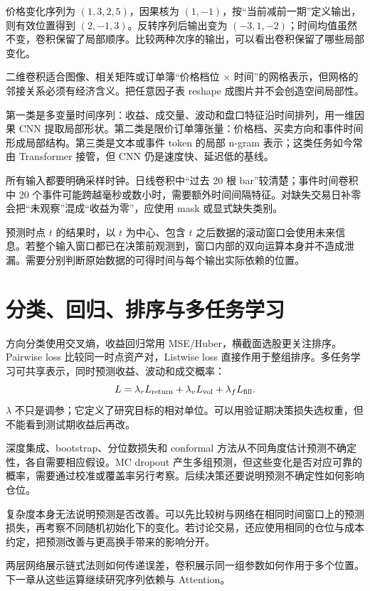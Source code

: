 


价格变化序列为 $(1,3,2,5)$，因果核为 $(1,-1)$，按“当前减前一期”定义输出，则有效位置得到 $(2,-1,3)$。反转序列后输出变为 $(-3,1,-2)$；时间均值虽然不变，卷积保留了局部顺序。比较两种次序的输出，可以看出卷积保留了哪些局部变化。

二维卷积适合图像、相关矩阵或订单簿“价格档位 $\times$ 时间”的网格表示，但网格的邻接关系必须有经济含义。把任意因子表 reshape 成图片并不会创造空间局部性。


第一类是多变量时间序列：收益、成交量、波动和盘口特征沿时间排列，用一维因果 CNN 提取局部形状。第二类是限价订单簿张量：价格档、买卖方向和事件时间形成局部结构。第三类是文本或事件 token 的局部 n-gram 表示；这类任务如今常由 Transformer 接管，但 CNN 仍是速度快、延迟低的基线。

所有输入都要明确采样时钟。日线卷积中“过去 20 根 bar”较清楚；事件时间卷积中 20 个事件可能跨越毫秒或数小时，需要额外时间间隔特征。对缺失交易日补零会把“未观察”混成“收益为零”，应使用 mask 或显式缺失类别。

\begin{diagnostic}
预测时点 $t$ 的结果时，以 $t$ 为中心、包含 $t$ 之后数据的滚动窗口会使用未来信息。若整个输入窗口都已在决策前观测到，窗口内部的双向运算本身并不造成泄漏。需要分别判断原始数据的可得时间与每个输出实际依赖的位置。
\end{diagnostic}

\section{分类、回归、排序与多任务学习}

方向分类使用交叉熵，收益回归常用 MSE/Huber，横截面选股更关注排序。Pairwise loss 比较同一时点资产对，Listwise loss 直接作用于整组排序。多任务学习可共享表示，同时预测收益、波动和成交概率：
\[
L=\lambda_r L_{\rm return}+\lambda_v L_{\rm vol}+
\lambda_f L_{\rm fill}.
\]
$\lambda$ 不只是调参；它定义了研究目标的相对单位。可以用验证期决策损失选权重，但不能看到测试期收益后再改。

深度集成、bootstrap、分位数损失和 conformal 方法从不同角度估计预测不确定性，各自需要相应假设。MC dropout 产生多组预测，但这些变化是否对应可靠的概率，需要通过校准或覆盖率另行考察。后续决策还要说明预测不确定性如何影响仓位。


复杂度本身无法说明预测是否改善。可以先比较树与网络在相同时间窗口上的预测损失，再考察不同随机初始化下的变化。若讨论交易，还应使用相同的仓位与成本约定，把预测改善与更高换手带来的影响分开。

两层网络展示链式法则如何传递误差，卷积展示同一组参数如何作用于多个位置。下一章从这些运算继续研究序列依赖与 Attention。
